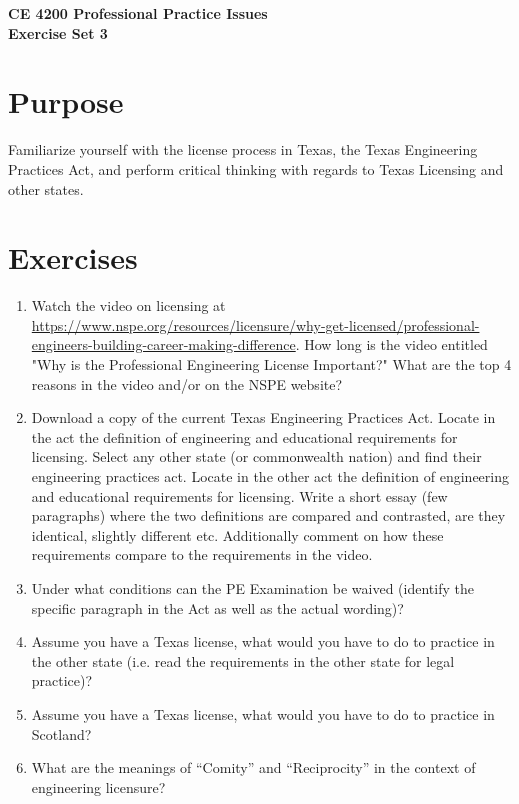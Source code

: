 \documentclass[12pt]{article}
\begin{document}
\begin{center}
{\textbf{{ CE 4200 Professional Practice Issues} \\ {Exercise Set 3}}}
\end{center}
\section*{\small{Purpose}}
Familiarize yourself with the license process in Texas, the Texas Engineering Practices Act, and perform critical thinking with regards to Texas Licensing and other states.
\section*{\small{Exercises}}
\begin{enumerate}
\item Watch the video on licensing at \url{https://www.nspe.org/resources/licensure/why-get-licensed/professional-engineers-building-career-making-difference}.  How long is the video entitled "Why is the Professional Engineering License Important?"  What are the top 4 reasons in the video and/or on the NSPE website?

\item Download a copy of the current Texas Engineering Practices Act.  Locate in the act the definition of engineering and educational requirements for licensing. Select any other state (or commonwealth nation) and find their engineering practices act.   Locate in the other act the definition of engineering and educational requirements for licensing.  Write a short essay (few paragraphs) where the two definitions are compared and contrasted, are they identical, slightly different etc.   Additionally comment on how these requirements compare to the requirements in the video.

\item Under what conditions can the PE Examination be waived (identify the specific paragraph in the Act as well as the actual wording)?

\item Assume you have a Texas license, what would you have to do to practice in the other state (i.e. read the requirements in the other state for legal practice)?

\item Assume you have a Texas license, what would you have to do to practice in Scotland?

\item What are the meanings of “Comity” and “Reciprocity” in the context of engineering licensure?

\end{enumerate}
\end{document}
